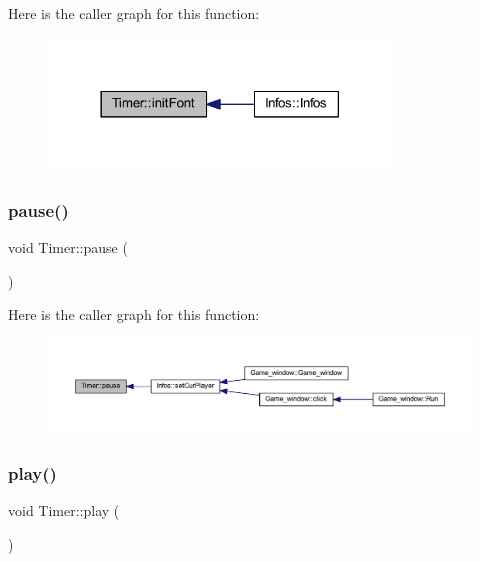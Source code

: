 Here is the caller graph for this function\+:
\nopagebreak
\begin{figure}[H]
\begin{center}
\leavevmode
\includegraphics[width=258pt]{class_timer_aac2ddf298c3916e8839e827b387e6973_icgraph}
\end{center}
\end{figure}
\mbox{\label{class_timer_a0289effad7b573c508bc27e405900a23}} 
\subsubsection{\texorpdfstring{pause()}{pause()}}
{\footnotesize\ttfamily void Timer\+::pause (\begin{DoxyParamCaption}{ }\end{DoxyParamCaption})}

Here is the caller graph for this function\+:
\nopagebreak
\begin{figure}[H]
\begin{center}
\leavevmode
\includegraphics[width=350pt]{class_timer_a0289effad7b573c508bc27e405900a23_icgraph}
\end{center}
\end{figure}
\mbox{\label{class_timer_a84acbe09a8dddae46c997c57a70c5076}} 
\subsubsection{\texorpdfstring{play()}{play()}}
{\footnotesize\ttfamily void Timer\+::play (\begin{DoxyParamCaption}{ }\end{DoxyParamCaption})}

